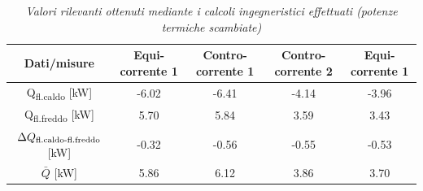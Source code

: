 \documentclass[a4paper,10pt]{article}                                                                                       %
\begin{document}
\vspace{3mm}                                                                                                                %
\begin{table}[H]                                                                                                            %
  \centering                                                                                                                %
  \begin{tabular}{||c|c|c|c|c||}                                                                                            %
    \hline
    Dati/misure                                         & Equi-corrente 1 & Contro-corrente 1 & Contro-corrente 2 & Equi-corrente 1 \\
    \hline\hline
    Q\textsubscript{fl.caldo} [kW]                      & -6.02           & -6.41             & -4.14             & -3.96           \\
    Q\textsubscript{fl.freddo} [kW]                     & 5.70            & 5.84              & 3.59              & 3.43            \\
    $\Delta{Q\textsubscript{fl.caldo-fl.freddo}}$ [kW]  & -0.32           & -0.56             & -0.55             & -0.53           \\
    $\bar{Q}$ [kW]                                      & 5.86            & 6.12              & 3.86              & 3.70            \\
    \hline
  \end{tabular}                                                                                                             %
  \caption{\textit{Valori rilevanti ottenuti mediante i calcoli ingegneristici effettuati (potenze termiche scambiate)}}    %
  \label{tab:heat_tr_calcs}                                                                                                 %
\end{table}                                                                                                                 %
\vspace{3mm}                                                                                                                %
\end{document}

